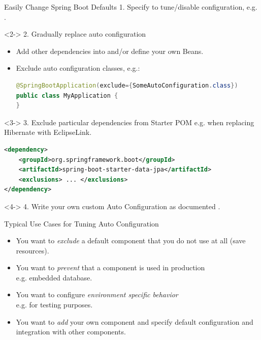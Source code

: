 \begin{frame}[fragile]{Easily Change Spring Boot Defaults}
\footnotesize 
1. Specify  to tune/disable configuration, e.g. .
\vfill
\begin{visibleenv}<2->
2. Gradually replace auto configuration
\begin{itemize}
	\item Add other dependencies into  and/or define your own Beans.
	\item Exclude auto configuration classes, e.g.:
		\begin{lstlisting}[language=java]
@SpringBootApplication(exclude={SomeAutoConfiguration.class})
public class MyApplication {
}
		\end{lstlisting}
\end{itemize}
\end{visibleenv}
\begin{visibleenv}<3->
3. Exclude particular dependencies from Starter POM e.g. when replacing	Hibernate with EclipseLink.
		\begin{lstlisting}[language=xml]	
<dependency>
    <groupId>org.springframework.boot</groupId>
    <artifactId>spring-boot-starter-data-jpa</artifactId>
    <exclusions> ... </exclusions>
</dependency>
		\end{lstlisting}
\end{visibleenv}
\begin{visibleenv}<4->
4. Write your own custom Auto Configuration as documented .
\end{visibleenv}
\end{frame}

\begin{frame}{Typical Use Cases for Tuning Auto Configuration}
\begin{itemize}
	\item You want to \textit{exclude} a default component that you do not use at all (save resources).
	\item You want to \textit{prevent} that a component is used in production \\e.g. embedded database.
	\item You want to configure \textit{environment specific behavior} \\e.g. for testing purposes.
	\item You want to \textit{add} your own component and specify default configuration and integration with other components.
\end{itemize}
\end{frame}

